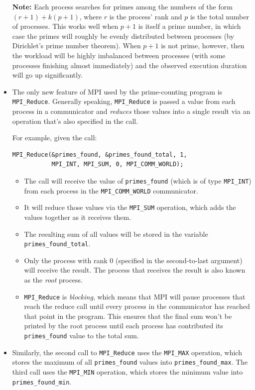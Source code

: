 \documentclass{article}
\begin{document}
\begin{itemize}
\textbf{Note:} Each process searches for primes among the numbers of the form $(r + 1) + k(p + 1)$, where $r$ is the process' rank and $p$ is the total number of processes. This works well when $p + 1$ is itself a prime number, in which case the primes will roughly be evenly distributed between processes (by Dirichlet's prime number theorem). When $p + 1$ is not prime, however, then the workload will be highly imbalanced between processes (with some processes finishing almost immediately) and the observed execution duration will go up significantly.

\item The only new feature of MPI used by the prime-counting program is \texttt{MPI\_Reduce}. Generally speaking, \texttt{MPI\_Reduce} is passed a value from each process in a communicator and \emph{reduces} those values into a single result via an operation that's also specified in the call.

For example, given the call:
\begin{verbatim}
MPI_Reduce(&primes_found, &primes_found_total, 1,
           MPI_INT, MPI_SUM, 0, MPI_COMM_WORLD);
\end{verbatim}
    \begin{itemize}
        \item The call will receive the value of \texttt{primes\_found} (which is of type \texttt{MPI\_INT}) from each process in the \texttt{MPI\_COMM\_WORLD} communicator.
        \item  It will reduce those values via the \texttt{MPI\_SUM} operation, which adds the values together as it receives them.
        \item The resulting sum of all values will be stored in the variable \texttt{primes\_found\_total}.
        \item Only the process with rank $0$ (specified in the second-to-last argument) will receive the result. The process that receives the result is also known as the \emph{root} process.
        \item \texttt{MPI\_Reduce} is \emph{blocking}, which means that MPI will pause processes that reach the reduce call until every process in the communicator has reached that point in the program. This ensures that the final sum won't be printed by the root process until each process has contributed its \texttt{primes\_found} value to the total sum.
    \end{itemize}

\item Similarly, the second call to \texttt{MPI\_Reduce} uses the \texttt{MPI\_MAX} operation, which stores the maximum of all \texttt{primes\_found} values into \texttt{primes\_found\_max}. The third call uses the \texttt{MPI\_MIN} operation, which stores the minimum value into \texttt{primes\_found\_min}.
\end{itemize}
\end{document}
